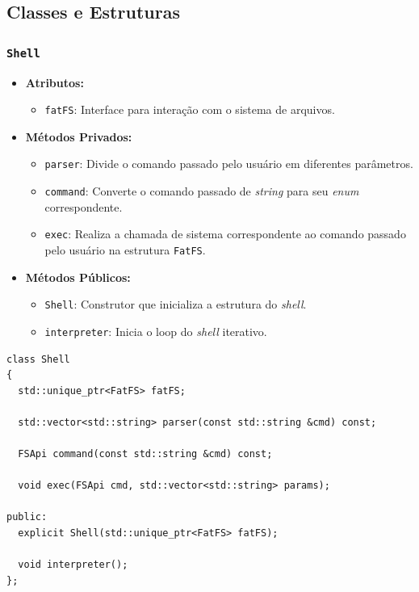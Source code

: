 \documentclass[
    12pt,				%
    oneside,   	        %
    a4paper,			%
    english,			%
    french,				%
    spanish,			%
    brazil,				%
    ]{pacotes/abntex2}
\begin{document}
\subsection{Classes e Estruturas}
\label{subsec:classes_estruturas}

\subsubsection{\texttt{Shell}}
\label{subsubsec:shell}

\begin{itemize}
    \item \textbf{Atributos:}
        \begin{itemize}
            \item \texttt{fatFS}: Interface para interação com o sistema de arquivos.
        \end{itemize}
    \item \textbf{Métodos Privados:}
        \begin{itemize}
            \item \texttt{parser}: Divide o comando passado pelo usuário em diferentes parâmetros.
            
            \item \texttt{command}: Converte o comando passado de \textit{string} para seu \textit{enum} correspondente.
            
            \item \texttt{exec}: Realiza a chamada de sistema correspondente ao comando passado pelo usuário na estrutura \texttt{FatFS}.
        \end{itemize}
            
    \item \textbf{Métodos Públicos:}
        \begin{itemize}
            \item \texttt{Shell}: Construtor que inicializa a estrutura do \textit{shell}.
            
            \item \texttt{interpreter}: Inicia o loop do \textit{shell} iterativo.
        \end{itemize}
\end{itemize}

\begin{lstlisting}[caption={Classe que implementa o \textit{shell}}, label={lst:shell}]
class Shell
{
  std::unique_ptr<FatFS> fatFS;

  std::vector<std::string> parser(const std::string &cmd) const;

  FSApi command(const std::string &cmd) const;

  void exec(FSApi cmd, std::vector<std::string> params);

public:
  explicit Shell(std::unique_ptr<FatFS> fatFS);

  void interpreter();
};
\end{lstlisting}
\end{document}
